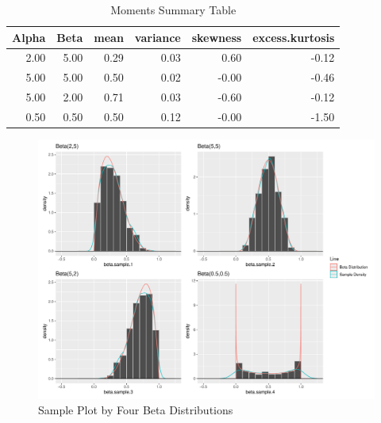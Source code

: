 \documentclass{article}\usepackage[]{graphicx}\usepackage[]{xcolor}
\makeatletter
\def\maxwidth{ %
  \ifdim\Gin@nat@width>\linewidth
    \linewidth
  \else
    \Gin@nat@width
  \fi
}
\newenvironment{knitrout}{}{} %
\makeatother
\begin{document}
\begin{table}[H]
\centering
\begingroup\small
\begin{tabular}{rrrrrr}
  \hline
Alpha & Beta & mean & variance & skewness & excess.kurtosis \\ 
  \hline
2.00 & 5.00 & 0.29 & 0.03 & 0.60 & -0.12 \\ 
  5.00 & 5.00 & 0.50 & 0.02 & -0.00 & -0.46 \\ 
  5.00 & 2.00 & 0.71 & 0.03 & -0.60 & -0.12 \\ 
  0.50 & 0.50 & 0.50 & 0.12 & -0.00 & -1.50 \\ 
   \hline
\end{tabular}
\endgroup
\caption{Moments Summary Table} 
\label{Table 2}
\end{table}



\begin{figure}[H]
\begin{center}
\begin{knitrout}
\color{fgcolor}

{\centering \includegraphics[width=\maxwidth]{figure/unnamed-chunk-6-1} 

}


\end{knitrout}
\caption{Sample Plot by Four Beta Distributions}
\label{plot2} 
\end{center}
\end{figure}
\end{document}
